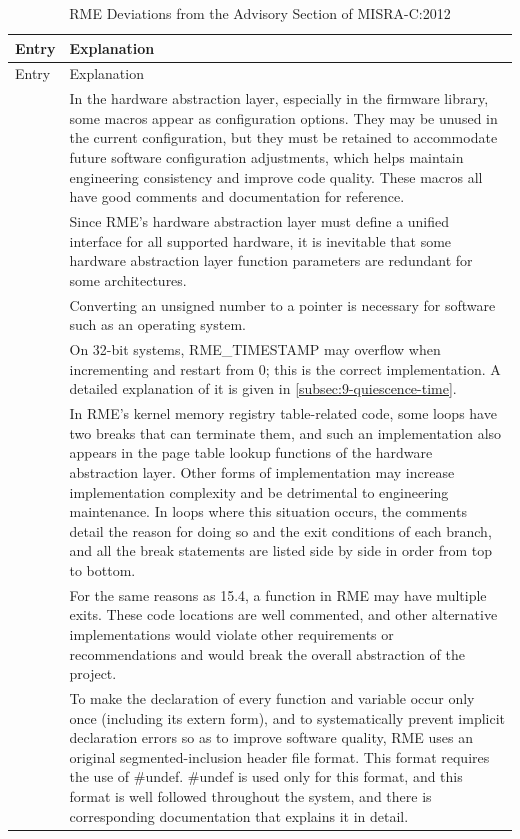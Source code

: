\begin{xltabular}{\textwidth}{@{}>{\hsize\raggedright\arraybackslash}X>{\hsize\raggedright\arraybackslash}X@{}}
\caption{RME Deviations from the Advisory Section of MISRA-C:2012}\label{tab:9-7-misra-advisory-deviations}\\
\toprule
Entry & Explanation\tabularnewline
\endfirsthead
\toprule
Entry & Explanation\tabularnewline
\midrule
\endhead
\bottomrule
{} &
In the hardware abstraction layer, especially in the firmware library, some macros appear as configuration options. They may be unused in the current configuration, but they must be retained to accommodate future software configuration adjustments, which helps maintain engineering consistency and improve code quality. These macros all have good comments and documentation for reference. &
Since RME's hardware abstraction layer must define a unified interface for all supported hardware, it is inevitable that some hardware abstraction layer function parameters are redundant for some architectures. &
Converting an unsigned number to a pointer is necessary for software such as an operating system. &
On 32-bit systems, RME\_TIMESTAMP may overflow when incrementing and restart from 0; this is the correct implementation. A detailed explanation of it is given in \ref{subsec:9-quiescence-time}. &
In RME's kernel memory registry table-related code, some loops have two breaks that can terminate them, and such an implementation also appears in the page table lookup functions of the hardware abstraction layer. Other forms of implementation may increase implementation complexity and be detrimental to engineering maintenance. In loops where this situation occurs, the comments detail the reason for doing so and the exit conditions of each branch, and all the break statements are listed side by side in order from top to bottom. &
For the same reasons as 15.4, a function in RME may have multiple exits. These code locations are well commented, and other alternative implementations would violate other requirements or recommendations and would break the overall abstraction of the project. &
To make the declaration of every function and variable occur only once (including its extern form), and to systematically prevent implicit declaration errors so as to improve software quality, RME uses an original segmented-inclusion header file format. This format requires the use of \#undef. \#undef is used only for this format, and this format is well followed throughout the system, and there is corresponding documentation that explains it in detail.\tabularnewline
\end{xltabular}
\nopagebreak[4]

